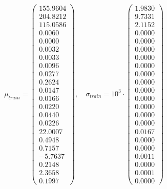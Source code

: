 \documentclass[a4paper, 11pt]{article}
\begin{document}
\begin{equation*}
  \mu_{\textit{train}} =
  \begin{pmatrix}
    155.9604 \\
    204.8212 \\
    115.0586 \\
      0.0060 \\
      0.0000 \\
      0.0032 \\
      0.0033 \\
      0.0096 \\
      0.0277 \\
      0.2624 \\
      0.0147 \\
      0.0166 \\
      0.0220 \\
      0.0440 \\
      0.0226 \\
     22.0007 \\
      0.4948 \\
      0.7157 \\
     -5.7637 \\
      0.2148 \\
      2.3658 \\
      0.1997
  \end{pmatrix}, \quad
  \sigma_{\textit{train}} = 10^3 \cdot
  \begin{pmatrix}
    1.9830 \\
    9.7331 \\
    2.1152 \\
    0.0000 \\
    0.0000 \\
    0.0000 \\
    0.0000 \\
    0.0000 \\
    0.0000 \\
    0.0000 \\
    0.0000 \\
    0.0000 \\
    0.0000 \\
    0.0000 \\
    0.0000 \\
    0.0167 \\
    0.0000 \\
    0.0000 \\
    0.0011 \\
    0.0000 \\
    0.0001 \\
    0.0000
  \end{pmatrix}
\end{equation*}
\end{document}
